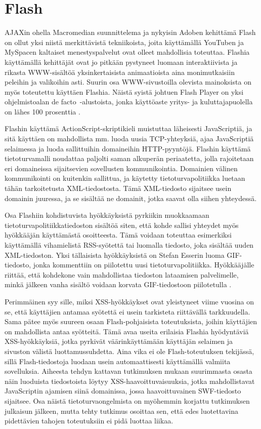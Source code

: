 \section{Flash}

AJAXin ohella Macromedian suunnittelema ja nykyisin Adoben kehittämä
Flash on ollut yksi niistä merkittävistä tekniikoista, joita käyttämällä
YouTuben ja MySpacen kaltaiset menestyspalvelut ovat olleet
mahdollisia toteuttaa. Flashia käyttämällä kehittäjät ovat jo pitkään
pystyneet luomaan interaktiivista ja rikasta WWW-sisältöä
yksinkertaisista animaatioista aina monimutkaisiin peleihin ja
valikoihin asti. Suurin osa WWW-si\-vus\-toil\-la olevista mainoksista on
myös toteutettu käyttäen Flashia. Näistä syistä johtuen Flash Player
on yksi ohjelmistoalan de facto~-alustoista, jonka käyttöaste yritys-
ja kuluttajapuolella on lähes 100 prosenttia \cite{Flash}.

Flashin käyttämä ActionScript-skriptikieli muistuttaa läheisesti
JavaScriptiä, ja sitä käyttäen on mahdollista mm. luoda uusia
TCP-yhteyksiä, ajaa JavaScriptiä selaimessa ja luoda sallittuihin
domaineihin HTTP-pyyn\-tö\-jä. Flashin käyttämä tietoturvamalli noudattaa
paljolti saman alkuperän periaatetta, jolla rajoitetaan eri
domaineissa sijaitsevien sovellusten kommunikointia. Domainien välinen
kommunikointi on kuitenkin sallittua, ja käytetty tietoturvapolitiikka
luetaan tähän tarkoitetusta XML-tiedostosta. Tämä XML-tiedosto
sijaitsee usein domainin juuressa, ja se sisältää ne domainit, jotka
saavat olla siihen yhteydessä.

Osa Flashiin kohdistuvista hyökkäyksistä pyrkiikin muokkaamaan
tietoturvapolitiikkatiedoston sisältöä siten, että kohde sallisi
yhteydet myös hyökkääjän käyttämästä osoitteesta. Tämä voidaan
toteuttaa esimerkiksi käyttämällä vihamielistä RSS-syötettä tai
luomalla tiedosto, joka sisältää uuden XML-tiedoston. Yksi tällaisista
hyökkäyksistä on Stefan Esserin luoma GIF-tiedosto, jonka kommenttiin
on piilotettu uusi tietoturvapolitiikka. Hyökkääjälle riittää, että
kohdekone vain mahdollistaa tiedoston lataamisen palvelimelle, minkä
jälkeen vanha sisältö voidaan korvata GIF-tiedostoon piilotetulla
\cite{WEB2}.

Perimmäinen syy sille, miksi XSS-hyökkäykset ovat yleistyneet viime
vuosina on se, että käyttäjien antamaa syötettä ei usein tarkisteta
riittävällä tarkkuudella. Sama pätee myös suureen osaan
Flash-pohjaisista toteutuksista, joihin käyttäjien on mahdollista
antaa syötteitä. Tämä avaa useita erilaisia Flashia hyödyntäviä
XSS-hyökkäyksiä, jotka pyrkivät väärinkäyttämään käyttäjän selaimen ja
sivuston välistä luottamussuhdetta. Aina vika ei ole Flash-toteutuksen
tekijässä, sillä Flash-tiedostoja luodaan usein automaattisesti
käyttämällä valmiita sovelluksia. Aiheesta tehdyn kattavan tutkimuksen
mukaan \cite{FlashXSS} suurimmasta osasta näin luoduista tiedostoista
löytyy XSS-haavoittuvaisuuksia, jotka mahdollistavat JavaScriptin
ajamisen siinä domainissa, jossa haavoittuvainen SWF-tiedosto
sijaitsee. Osa näistä tietoturvaongelmista on myöhemmin korjattu
tutkimuksen julkaisun jälkeen, mutta tehty tutkimus osoittaa sen, että
edes luotettavina pidettävien tahojen toteutuksiin ei pidä luottaa
liikaa.

